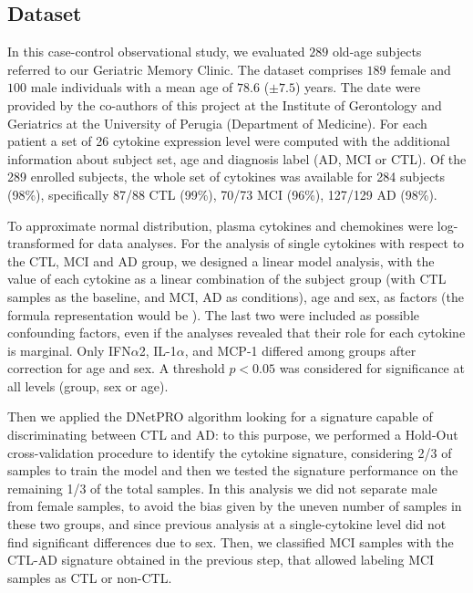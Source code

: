 \documentclass{standalone}
\begin{document}
\subsection[Dataset]{Dataset}\label{cytokine:cytokine_data}

In this case-control observational study, we evaluated $289$ old-age subjects referred to our Geriatric Memory Clinic.
The dataset comprises $189$ female and $100$ male individuals with a mean age of $78.6$ ($\pm7.5$) years.
The date were provided by the co-authors of this project at the Institute of Gerontology and Geriatrics at the University of Perugia (Department of Medicine).
For each patient a set of 26 cytokine expression level were computed with the additional information about subject set, age and diagnosis label (AD, MCI or CTL).
Of the 289 enrolled subjects, the whole set of cytokines was available for 284 subjects (98\%), specifically 87/88 CTL (99\%), 70/73 MCI (96\%), 127/129 AD (98\%).

To approximate normal distribution, plasma cytokines and chemokines were log-transformed for data analyses.
For the analysis of single cytokines with respect to the CTL, MCI and AD group, we designed a linear model analysis, with the value of each cytokine as a linear combination of the subject group (with CTL samples as the baseline, and MCI, AD as conditions), age and sex, as factors (the formula representation would be ).
The last two were included as possible confounding factors, even if the analyses revealed that their role for each cytokine is marginal.
Only IFN$\alpha$2, IL-1$\alpha$, and MCP-1 differed among groups after correction for age and sex.
A threshold $p<0.05$ was considered for significance at all levels (group, sex or age).

Then we applied the \textsf{DNetPRO} algorithm looking for a signature capable of discriminating between CTL and AD: to this purpose, we performed a Hold-Out cross-validation procedure to identify the cytokine signature, considering 2/3 of samples to train the model and then we tested the signature performance on the remaining 1/3 of the total samples.
In this analysis we did not separate male from female samples, to avoid the bias given by the uneven number of samples in these two groups, and since previous analysis at a single-cytokine level did not find significant differences due to sex.
Then, we classified MCI samples with the CTL-AD signature obtained in the previous step, that allowed labeling MCI samples as CTL or non-CTL.

\end{document}
